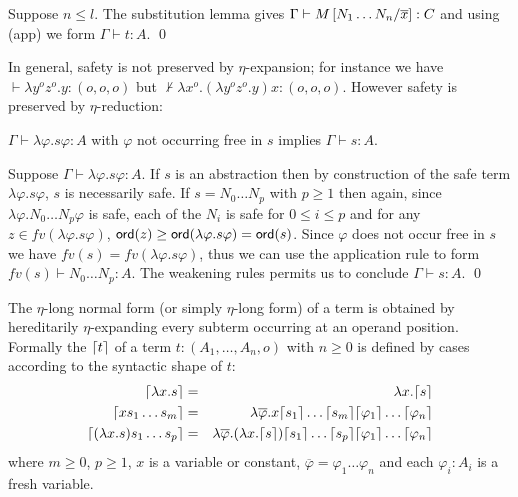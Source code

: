 Suppose $n \leq l$. The substitution lemma gives
$\Gamma \vdash M\left[ N_1 \ldots N_n/\overline{x} \right] : C$ and using {\sf(app)} we form $\Gamma \vdash t :A$.
  \qed


In general, safety is not preserved by $\eta$-expansion; for instance we have
$\vdash \lambda y^o z^o . y : (o,o,o)$ but
$\not \vdash \lambda x^o . (\lambda y^o z^o . y) x : (o,o,o)$.
However safety is preserved by $\eta$-reduction:

\begin{lemma}
  $\Gamma \vdash \lambda \varphi . s \varphi :A $ with $\varphi$ not
  occurring free in $s$ implies $\Gamma \vdash s :A$.
\end{lemma}
\proof
  Suppose $\Gamma \vdash \lambda \varphi . s \varphi :A$. If $s$ is an  abstraction then by construction of the safe term $\lambda \varphi . s \varphi$, $s$ is necessarily safe.  If $s = N_0 \ldots N_p$ with
  $p\geq 1$ then again, since $\lambda \varphi . N_0 \ldots N_p
  \varphi$ is safe, each of the $N_i$ is safe for $0 \leq i \leq p$
  and for any $z\in fv(\lambda \varphi . s \varphi)$, ${\sf ord}(z) \geq
  {\sf ord}(\lambda \varphi . s \varphi) = {\sf ord}(s)$. Since  $\varphi$ does not occur free in $s$ we have $fv(s) = fv(\lambda \varphi . s \varphi)$, thus we can use the application rule to form $fv(s) \vdash N_0 \ldots N_p : A$. The weakening rules permits us to conclude $\Gamma \vdash s :A$. \qed



The $\eta$-long normal form (or simply $\eta$-long form) of a term
is obtained by hereditarily $\eta$-expanding every subterm occurring
at an operand position. Formally the 
$\lceil t\rceil$ of a term $t: (A_1,\ldots,A_n,o)$ with $n \geq 0$ is
defined by cases according to the syntactic shape of $t$:
\begin{eqnarray*}
  \lceil \lambda x . s \rceil &=& \lambda x . \lceil s\rceil \\
  \lceil x s_1 \ldots s_m \rceil &=& \lambda \overline{\varphi} . x \lceil s_1\rceil\ldots \lceil s_m\rceil \lceil \varphi_1\rceil \ldots \lceil \varphi_n\rceil \\
  \lceil (\lambda x . s) s_1 \ldots s_p \rceil &=& \lambda \overline{\varphi} . (\lambda x . \lceil s\rceil) \lceil s_1\rceil \ldots \lceil s_p\rceil \lceil \varphi_1\rceil \ldots \lceil \varphi_n\rceil
\end{eqnarray*}
where $m \geq 0$, $p\geq 1$, $x$ is a  variable or constant, $\overline{\varphi} = \varphi_1 \ldots \varphi_n$ and each $\varphi_i : A_i$ is a fresh variable.

